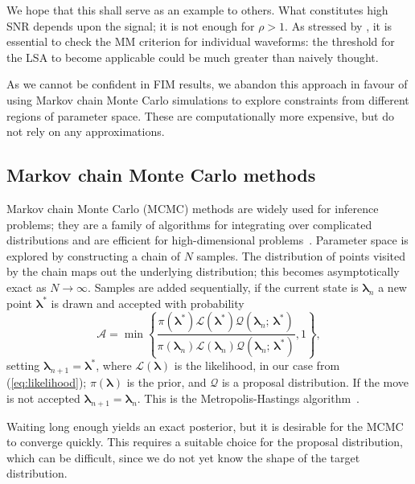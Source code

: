 \documentclass[useAMS,usedcolumn,usegraphicx,usenatbib]{mn2e}
\newcommand{\eqnref}[1]{(\ref{eq:#1})}
\begin{document}
We hope that this shall serve as an example to others. What constitutes high SNR depends upon the signal; it is not enough for $\rho > 1$. As stressed by \citet{Vallisneri2008}, it is essential to check the MM criterion for individual waveforms: the threshold for the LSA to become applicable could be much greater than naively thought.

As we cannot be confident in FIM results, we abandon this approach in favour of using Markov chain Monte Carlo simulations to explore constraints from different regions of parameter space. These are computationally more expensive, but do not rely on any approximations.

\subsection{Markov chain Monte Carlo methods}

Markov chain Monte Carlo (MCMC) methods are widely used for inference problems; they are a family of algorithms for integrating over complicated distributions and are efficient for high-dimensional problems~\citep[chapter 29]{MacKay2003}. Parameter space is explored by constructing a chain of $N$ samples. The distribution of points visited by the chain maps out the underlying distribution; this becomes asymptotically exact as $N \rightarrow \infty$. Samples are added sequentially, if the current state is $\boldsymbol{\lambda}_n$ a new point $\boldsymbol{\lambda}^\ast$ is drawn and accepted with probability
\begin{equation}
\mathcal{A} = \min\left\{\frac{\pi(\boldsymbol{\lambda}^\ast)\mathcal{L}(\boldsymbol{\lambda}^\ast)\mathcal{Q}(\boldsymbol{\lambda}_n;\,\boldsymbol{\lambda}^\ast)}{\pi(\boldsymbol{\lambda}_n)\mathcal{L}(\boldsymbol{\lambda}_n)\mathcal{Q}(\boldsymbol{\lambda}_n;\,\boldsymbol{\lambda}^\ast)}, 1\right\},
\end{equation}
setting $\boldsymbol{\lambda}_{n + 1} = \boldsymbol{\lambda}^\ast$, where $\mathcal{L}(\boldsymbol{\lambda})$ is the likelihood, in our case from \eqnref{likelihood}; $\pi(\boldsymbol{\lambda})$ is the prior, and $\mathcal{Q}$ is a proposal distribution. If the move is not accepted  $\boldsymbol{\lambda}_{n + 1} = \boldsymbol{\lambda}_n$. This is the Metropolis-Hastings algorithm~\citep{Metropolis1953,Hastings1970}.

Waiting long enough yields an exact posterior, but it is desirable for the MCMC to converge quickly. This requires a suitable choice for the proposal distribution, which can be difficult, since we do not yet know the shape of the target distribution.
\end{document}
